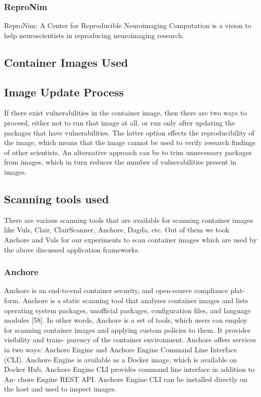 \documentclass[a4paper,num-refs]{oup-contemporary}
\begin{document}
\subsubsection{ReproNim}

ReproNim: A Center for Reproducible Neuroimaging Computation is a vision
to help neuroscientists in reproducing neuroimaging research.

\subsection{Container Images Used}

\subsection{Image Update Process}

If there exist vulnerabilities in the container image, then there are two ways
to proceed, either not to run that image at all, or run only after updating the
packages that have vulnerabilities. The latter option effects the reproducibility
of the image, which means that the image cannot be used to verify research
findings of other scientists. An alternative approach can be to trim unnecessary
packages from images, which in turn reduces the number of vulnerabilities
present in images.


\subsection{Scanning tools used}

There are various scanning tools that are available for scanning container
images like Vuls, Clair, ClairScanner, Anchore, Dagda, etc. Out of them we
took Anchore and Vuls for our experiments to scan container
images which are used by the above discussed application frameworks.

\subsubsection{Anchore}

Anchore is an end-to-end container security, and open-source compliance plat-
form. Anchore is a static scanning tool that analyses container images and
lists operating system packages,
unofficial packages, configuration files, and language modules [58]. In other
words, Anchore is a set of tools, which users can employ for scanning container
images and applying custom policies to them. It provides visibility and trans-
parency of the container environment. Anchore offers services in two ways:
Anchore Engine and Anchore Engine Command Line Interface (CLI).
Anchore Engine is available as a Docker image, which is available on Docker
Hub. Anchore Engine CLI provides command line interface in addition to An-
chore Engine REST API. Anchore Engine CLI can be installed directly on the
host and used to inspect images.
\end{document}
